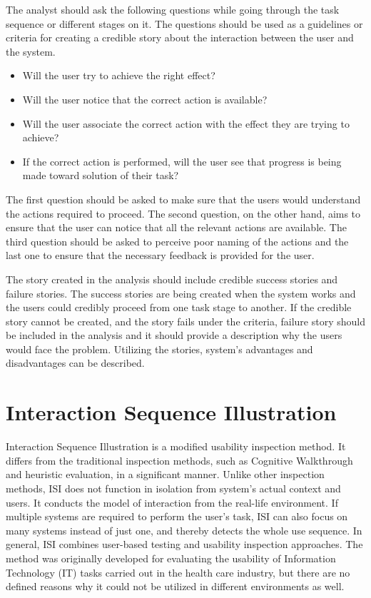 \documentclass[12pt,a4paper,oneside,pdftex]{report}
\begin{document}
The analyst should ask the following questions while going through the task sequence or different stages on it. The questions should be used as a guidelines or criteria for creating a credible story about the interaction between the user and the system. \citep{RefWorks:26}
\begin{itemize}
\item Will the user try to achieve the right effect?
\item Will the user notice that the correct action is available?
\item Will the user associate the correct action with the effect they are trying to achieve?
\item If the correct action is performed, will the user see that progress is being made toward solution of their task?
\end{itemize}

The first question should be asked to make sure that the users would understand the actions required to proceed. The second question, on the other hand, aims to ensure that the user can notice that all the relevant actions are available.
The third question should be asked to perceive poor naming of the actions and the last one to ensure that the necessary feedback is provided for the user. 

The story created in the analysis should include credible success stories and failure stories. The success stories are being created when the system works and the users could credibly proceed from one task stage to another. If the credible story cannot be created, and the story fails under the criteria, failure story should be included in the analysis and it should provide a description why the users would face the problem. Utilizing the stories, system's advantages and disadvantages can be described. \citep{RefWorks:26} 		

\section{Interaction Sequence Illustration}
\label{sec:isi}
Interaction Sequence Illustration is a modified usability inspection method. It differs from the traditional inspection methods, such as Cognitive Walkthrough and heuristic evaluation, in a significant manner. Unlike other inspection methods, ISI does not function in isolation from system's actual context and users. It conducts the model of interaction from the real-life environment. If multiple systems are required to perform the user's task, ISI can also focus on many systems instead of just one, and thereby detects the whole use sequence. In general, ISI combines user-based testing and usability inspection approaches. The method was originally developed for evaluating the usability of Information Technology (IT) tasks carried out in the health care industry, but there are no defined reasons why it could not be utilized in different environments as well.  \citep{RefWorks:17} 
\end{document}
